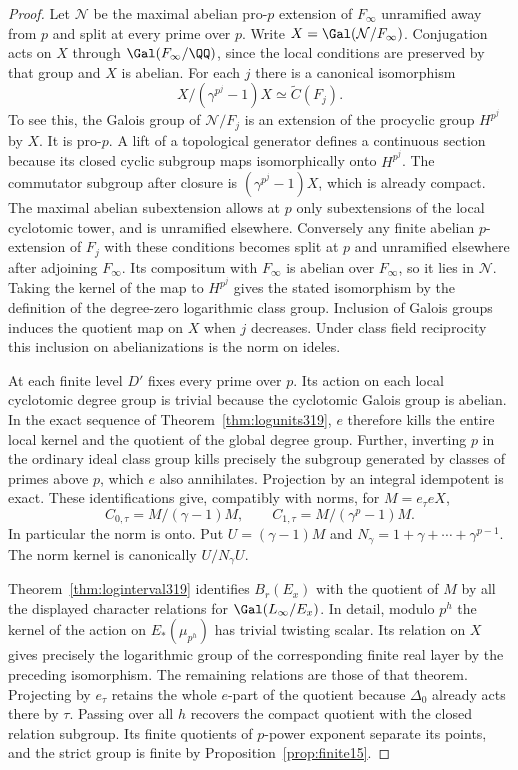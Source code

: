 \documentclass[a4paper,11pt]{article}
\theoremstyle{definition}
\theoremstyle{remark}
\numberwithin{equation}{section}
\begin{document}
\begin{proof}
Let \(\mathcal N\) be the maximal abelian pro-\(p\) extension of
\(F_\infty\) unramified away from \(p\) and split at every prime
over \(p\). Write \(X=\Gal(\mathcal N/F_\infty)\). Conjugation acts
on \(X\) through \(\Gal(F_\infty/\QQ)\), since the local conditions
are preserved by that group and \(X\) is abelian. For each \(j\)
there is a canonical isomorphism
\[
 X/(\gamma^{p^j}-1)X \simeq \widetilde C(F_j).
\]
To see this, the Galois group of \(\mathcal N/F_j\) is an
extension of the procyclic group \(H^{p^j}\) by \(X\). It is
pro-\(p\). A lift of a topological generator defines a continuous
section because its closed cyclic subgroup maps isomorphically
onto \(H^{p^j}\). The commutator subgroup after closure is
\((\gamma^{p^j}-1)X\), which is already compact. The maximal
abelian subextension allows at \(p\) only subextensions of the
local cyclotomic tower, and is unramified elsewhere. Conversely
any finite abelian \(p\)-extension of \(F_j\) with these
conditions becomes split at \(p\) and unramified elsewhere
after adjoining \(F_\infty\). Its compositum with \(F_\infty\)
is abelian over \(F_\infty\), so it lies in \(\mathcal N\).
Taking the kernel of the map to \(H^{p^j}\) gives the stated
isomorphism by the definition of the degree-zero logarithmic
class group. Inclusion of Galois groups induces the quotient
map on \(X\) when \(j\) decreases. Under class field reciprocity
this inclusion on abelianizations is the norm on ideles.

At each finite level \(D'\) fixes every prime over \(p\). Its
action on each local cyclotomic degree group is trivial because
the cyclotomic Galois group is abelian. In the exact sequence of
Theorem~\ref{thm:logunits319}, \(e\) therefore kills the entire
local kernel and the quotient of the global degree group.
Further, inverting \(p\) in the ordinary ideal class group kills
precisely the subgroup generated by classes of primes above
\(p\), which \(e\) also annihilates. Projection by an integral
idempotent is exact. These identifications give, compatibly
with norms, for \(M=e_\tau eX\),
\[
 C_{0,\tau}=M/(\gamma-1)M,\qquad
 C_{1,\tau}=M/(\gamma^p-1)M .
\]
In particular the norm is onto. Put \(U=(\gamma-1)M\) and
\(N_\gamma=1+\gamma+\cdots+\gamma^{p-1}\).
The norm kernel is canonically \(U/N_\gamma U\).

Theorem~\ref{thm:loginterval319} identifies \(B_r(E_x)\)
with the quotient of \(M\) by all the displayed character
relations for \(\Gal(L_\infty/E_x)\). In detail, modulo \(p^h\)
the kernel of the action on \(E_*(\mu_{p^h})\) has trivial
twisting scalar. Its relation on \(X\) gives precisely the
logarithmic group of the corresponding finite real layer by
the preceding isomorphism. The remaining relations are those
of that theorem. Projecting by \(e_\tau\) retains the whole
\(e\)-part of the quotient because \(\Delta_0\) already acts
there by \(\tau\). Passing over all \(h\) recovers the compact
quotient with the closed relation subgroup. Its finite
quotients of \(p\)-power exponent separate its points, and
the strict group is finite by Proposition~\ref{prop:finite15}.


\end{proof}
\end{document}
